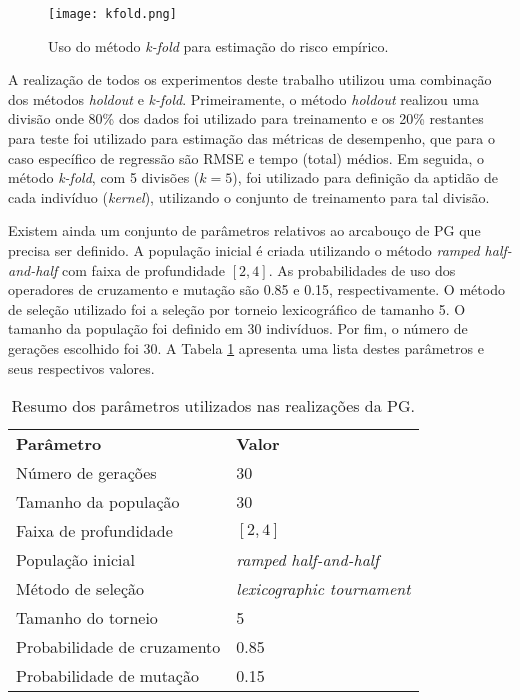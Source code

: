 \begin{figure}[H]
    \caption{Uso do método \textit{k-fold} para estimação do risco empírico.}
    \label{fig:k-fold}
    \centering
    \texttt{[image: kfold.png]}
    \begin{center}
    \end{center}
\end{figure}

A realização de todos os experimentos deste trabalho utilizou uma combinação dos métodos \textit{holdout} e \textit{k-fold}. Primeiramente, o método \textit{holdout} realizou uma divisão onde 80\% dos dados foi utilizado para treinamento e os 20\% restantes para teste foi utilizado para estimação das métricas de desempenho, que para o caso específico de regressão são RMSE e tempo (total) médios. Em seguida, o método \textit{k-fold}, com 5 divisões ($k=5$), foi utilizado para definição da aptidão de cada indivíduo (\textit{kernel}), utilizando o conjunto de treinamento para tal divisão.

Existem ainda um conjunto de parâmetros relativos ao arcabouço de PG que precisa ser definido. A população inicial é criada utilizando o método \textit{ramped half-and-half} com faixa de profundidade $[2, 4]$. As probabilidades de uso dos operadores de cruzamento e mutação são 0.85 e 0.15, respectivamente. O método de seleção utilizado foi a seleção por torneio lexicográfico de tamanho 5. O tamanho da população foi definido em 30 indivíduos. Por fim, o número de gerações escolhido foi 30. A Tabela \ref{tab:pg-params} apresenta uma lista destes parâmetros e seus respectivos valores.

\begin{table}[H]
    \caption{Resumo dos parâmetros utilizados nas realizações da PG.}
    \label{tab:pg-params}
    \begin{center}
        \begin{tabular}{l@{\hskip 18pt}l}
            \hline\noalign{\smallskip}
            \textbf{Parâmetro} & \textbf{Valor}\\
            \noalign{\smallskip}
            \hline
            \noalign{\smallskip}
            Número de gerações & 30 \\
            Tamanho da população & 30 \\
            Faixa de profundidade & $[2, 4]$ \\
            População inicial & \textit{ramped half-and-half} \\
            Método de seleção & \textit{lexicographic tournament} \\
            Tamanho do torneio & 5 \\
            Probabilidade de cruzamento & 0.85 \\
            Probabilidade de mutação & 0.15 \\
            \hline
        \end{tabular}
    \end{center}
    \begin{center}
    \end{center}
\end{table}


